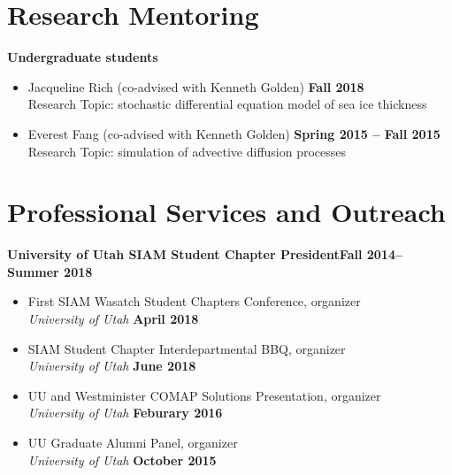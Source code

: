 \documentclass[margin,line]{res}
\begin{document}
\begin{resume}
\section{\sc Research Mentoring}
{\bf Undergraduate students}
\begin{itemize}
\item[ ] Jacqueline Rich (co-advised with Kenneth Golden) 
\hfill {\bf Fall 2018} \\
Research Topic: stochastic differential equation model of sea ice thickness
\item[ ] Everest Fang (co-advised with Kenneth Golden)
\hfill {\bf Spring 2015 -- Fall 2015}\\
Research Topic: simulation of advective diffusion processes
\end{itemize}

\section{\sc Professional Services and Outreach}

{\bf University of Utah SIAM Student Chapter President}\hfill{\bf Fall 2014--Summer 2018}
\begin{itemize}
\item[ ] First SIAM Wasatch Student Chapters Conference, organizer
\\ {\it University of Utah} \hfill {\bf April 2018}
\item[ ] SIAM Student Chapter Interdepartmental BBQ, organizer
\\ {\it University of Utah} \hfill {\bf June 2018}
\item[ ] UU and Westminister COMAP Solutions Presentation, organizer
\\ {\it University of Utah} \hfill {\bf Feburary 2016}
\item[ ] UU Graduate Alumni Panel, organizer 
\\ {\it University of Utah} \hfill {\bf October 2015}
\end{itemize}


\end{resume}
\end{document}
